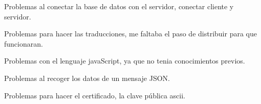 \begin{DoxyItemize}
\item Problemas al conectar la base de datos con el servidor, conectar cliente y servidor.
\item Problemas para hacer las traducciones, me faltaba el paso de distribuir para que funcionaran.
\item Problemas con el lenguaje java\+Script, ya que no tenia conocimientos previos.
\item Problemas al recoger los datos de un mensaje J\+S\+ON.
\item Problemas para hacer el certificado, la clave pública ascii. 
\end{DoxyItemize}